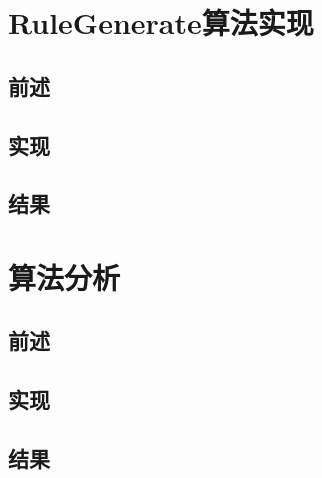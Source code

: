 \documentclass[a4paper]{article}
\begin{document}
\section{RuleGenerate算法实现}

\subsection{前述}
\subsection{实现}
\subsection{结果}

\newpage

\section{算法分析}

\subsection{前述}
\subsection{实现}
\subsection{结果}

\newpage

\end{document}
